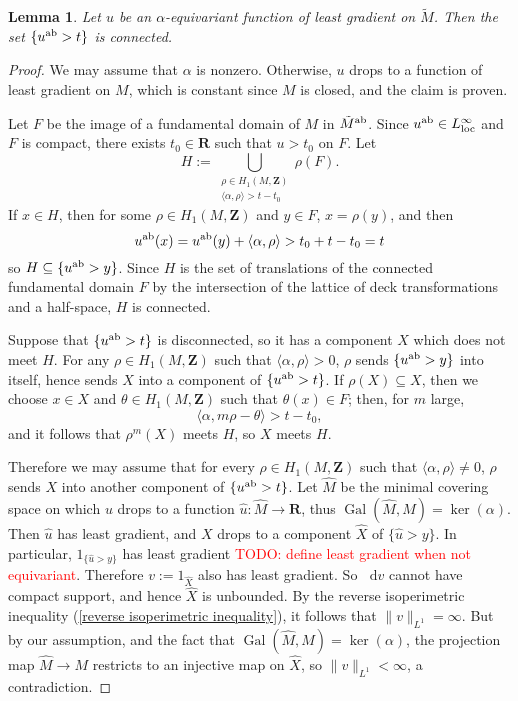 \documentclass[reqno,11pt]{amsart}
\newcommand{\ZZ}{\mathbf{Z}}
\newcommand{\RR}{\mathbf{R}}
\newcommand*\dif{\mathop{}\!\mathrm{d}}
\DeclareMathOperator{\Gal}{Gal}
\newcommand{\loc}{\mathrm{loc}}
\newtheorem{lemma}[theorem]{Lemma}
\theoremstyle{definition}
\numberwithin{equation}{section}
\newcommand\todo[1]{\textcolor{red}{TODO: #1}}
\begin{document}
\begin{lemma}\label{superlevel sets are connected}
Let $u$ be an $\alpha$-equivariant function of least gradient on $\tilde M$.
Then the set $\{u^{\rm ab} > t\}$ is connected.
\end{lemma}
\begin{proof}
We may assume that $\alpha$ is nonzero.
Otherwise, $u$ drops to a function of least gradient on $M$, which is constant since $M$ is closed, and the claim is proven.

Let $F$ be the image of a fundamental domain of $M$ in $\tilde M^{\rm ab}$.
Since $u^{\rm ab} \in L^\infty_\loc$ \cite[Theorem 4.3]{Gorny20} and $F$ is compact, there exists $t_0 \in \RR$ such that $u > t_0$ on $F$.
Let 
$$H := \bigcup_{\substack{\rho \in H_1(M, \ZZ) \\ \langle \alpha, \rho\rangle > t - t_0}} \rho(F).$$
If $x \in H$, then for some $\rho \in H_1(M, \ZZ)$ and $y \in F$, $x = \rho(y)$, and then 
$$u^{\rm ab}(x) = u^{\rm ab}(y) + \langle \alpha, \rho\rangle > t_0 + t - t_0 = t$$
so $H \subseteq \{u^{\rm ab} > y\}$.
Since $H$ is the set of translations of the connected fundamental domain $F$ by the intersection of the lattice of deck transformations and a half-space, $H$ is connected.

Suppose that $\{u^{\rm ab} > t\}$ is disconnected, so it has a component $X$ which does not meet $H$.
For any $\rho \in H_1(M, \ZZ)$ such that $\langle \alpha, \rho\rangle > 0$, $\rho$ sends $\{u^{\rm ab} > y\}$ into itself, hence sends $X$ into a component of $\{u^{\rm ab} > t\}$.
If $\rho(X) \subseteq X$, then we choose $x \in X$ and $\theta \in H_1(M, \ZZ)$ such that $\theta(x) \in F$; then, for $m$ large, 
$$\langle \alpha, m\rho - \theta\rangle > t - t_0,$$
and it follows that $\rho^m(X)$ meets $H$, so $X$ meets $H$.

Therefore we may assume that for every $\rho \in H_1(M, \ZZ)$ such that $\langle \alpha, \rho\rangle \neq 0$, $\rho$ sends $X$ into another component of $\{u^{\rm ab} > t\}$.
Let $\hat M$ be the minimal covering space on which $u$ drops to a function $\hat u: \hat M \to \RR$, thus $\Gal(\hat M, M) = \ker(\alpha)$.
Then $\hat u$ has least gradient, and $X$ drops to a component $\hat X$ of $\{\hat u > y\}$.
In particular, $1_{\{\hat u > y\}}$ has least gradient \cite[Theorem 1]{BOMBIERI1969} \todo{define least gradient when not equivariant}.
Therefore $v := 1_{\hat X}$ also has least gradient.
So $\dif v$ cannot have compact support, and hence $\hat X$ is unbounded.
By the reverse isoperimetric inequality (\ref{reverse isoperimetric inequality}), it follows that $\|v\|_{L^1} = \infty$.
But by our assumption, and the fact that $\Gal(\hat M, M) = \ker(\alpha)$, the projection map $\hat M \to M$ restricts to an injective map on $\hat X$, so $\|v\|_{L^1} < \infty$, a contradiction.
\end{proof}
\end{document}
